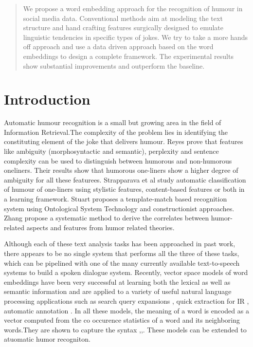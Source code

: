 \documentclass{acm_proc_article-sp}
\begin{document}
\maketitle
\begin{abstract}

We propose a word embedding approach for the recognition of humour in social media data. Conventional methods aim at modeling the text structure and hand crafting features surgically designed to emulate linguistic tendencies in specific types of jokes. We try to take a more hands off approach and use a data driven approach based on the word embeddings to design a complete framework. The experimental results show substantial improvements and outperform the baseline.
\end{abstract}





\section{Introduction}
Automatic humour recognition is a small but growing area in the field of Information Retrieval.The complexity of the problem lies in identifying the constituting element of the joke that delivers humour. Reyes \cite{reyes2010evaluating} prove that features like ambiguity (morphosyntactic and semantic), perplexity and sentence complexity can be used to distinguish between humorous and non-humorous oneliners. Their results show that humorous one-liners show a higher degree of ambiguity for all these featurees. Strapparava\cite{stock2006automatic} et al study automatic classification of humour of one-liners using stylistic features, content-based features or both in a learning framework. Stuart  \cite{stuart2012constructions} proposes a template-match based recognition system using Ontological System Technology and constructionist approaches. Zhang \cite{zhang2014recognizing} propose a systematic method to derive the correlates between humor-related aspects and features from humor related theories. 

Although each of these text analysis tasks has been approached in past work, there appears to be no single system that performs all the three of these tasks, which can be pipelined with one of the many currently available text-to-speech systems to build a spoken dialogue system. Recently, vector space models of word embeddings have been very successful at learning both the lexical as well as semantic information and are applied to a variety of useful natural language processing applications such as search query expansions \cite{jones2006generating}, quick extraction for IR \cite{pacsca2006names}, automatic annotation \cite{ratinov2011local}. In all these models, the meaning of a word is encoded as a vector computed from the co occurence statistics of a word and its neighboring words.They are shown to capture the syntax \cite{mikolov2013efficient},\cite{huang2012improving},\cite{turian2010word}. These models can be extended to atuomatic humor recogniton. 
\end{document}
